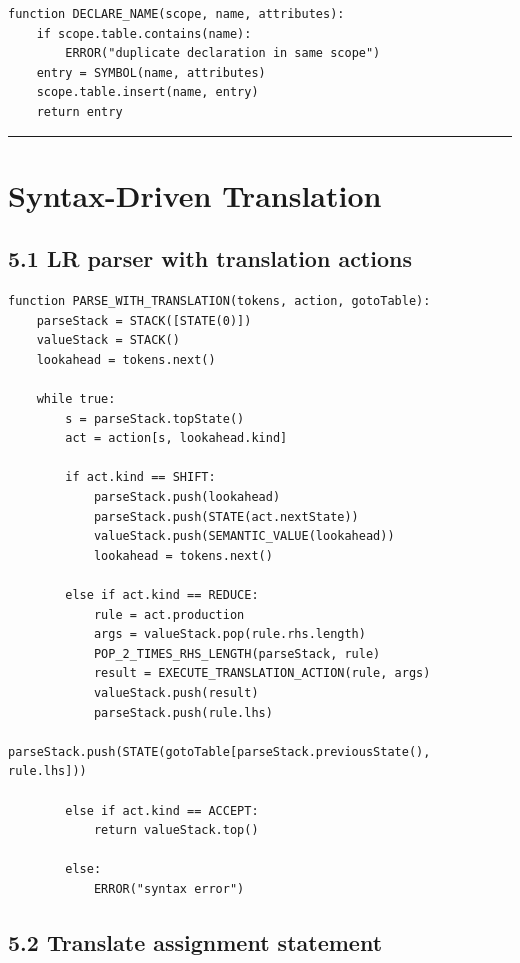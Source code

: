 \documentclass[10pt,letterpaper]{article}
\begin{document}
\begin{verbatim}
function DECLARE_NAME(scope, name, attributes):
    if scope.table.contains(name):
        ERROR("duplicate declaration in same scope")
    entry = SYMBOL(name, attributes)
    scope.table.insert(name, entry)
    return entry
\end{verbatim}

\medskip\hrule\medskip

\clearpage
\section{Syntax-Driven Translation}

\subsection*{5.1 LR parser with translation actions}

\begin{verbatim}
function PARSE_WITH_TRANSLATION(tokens, action, gotoTable):
    parseStack = STACK([STATE(0)])
    valueStack = STACK()
    lookahead = tokens.next()

    while true:
        s = parseStack.topState()
        act = action[s, lookahead.kind]

        if act.kind == SHIFT:
            parseStack.push(lookahead)
            parseStack.push(STATE(act.nextState))
            valueStack.push(SEMANTIC_VALUE(lookahead))
            lookahead = tokens.next()

        else if act.kind == REDUCE:
            rule = act.production
            args = valueStack.pop(rule.rhs.length)
            POP_2_TIMES_RHS_LENGTH(parseStack, rule)
            result = EXECUTE_TRANSLATION_ACTION(rule, args)
            valueStack.push(result)
            parseStack.push(rule.lhs)
            parseStack.push(STATE(gotoTable[parseStack.previousState(), rule.lhs]))

        else if act.kind == ACCEPT:
            return valueStack.top()

        else:
            ERROR("syntax error")
\end{verbatim}

\subsection*{5.2 Translate assignment statement}
\end{document}
